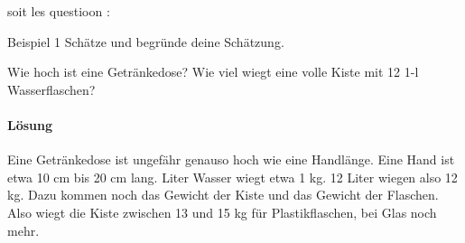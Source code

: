 \documentclass[a4paper,12pt]{extarticle}
\begin{document}
\makeatletter
\begin{tcolorbox}[enhanced,
  skin=bicolor,
  arc=0pt,
  coltitle=white,
  colframe=textnewGreen,
  colback=bgnewGreen,
  colbacklower=white,
  fonttitle=\bfseries,
  detach title,
  title={Exercice},
  before upper*={%
    \vskip-\dimexpr\kvtcb@boxsep+\kvtcb@top+.1pt
    \hspace*{-\dimexpr\kvtcb@boxsep+\kvtcb@leftupper+.1pt}%
    \expandafter\titlebox\expandafter{\tcbtitletext} %
  }]
soit les questioon :
\end{tcolorbox}
\makeatother
\begin{gruenebox}{Beispiel 1}
 Schätze und begründe deine Schätzung.
 \begin{tasks}
 \task Wie hoch ist eine Getränkedose?
 \task  Wie viel wiegt eine volle Kiste mit 12 1-l Wasserflaschen?
 \end{tasks}
 \tcblower
 \paragraph{Lösung}
 \begin{tasks}
 \task Eine Getränkedose ist ungefähr genauso hoch wie eine Handlänge. Eine Hand ist etwa 10 cm bis 20 cm lang.
 \task Liter Wasser wiegt etwa 1 kg. 12 Liter wiegen also 12 kg. Dazu kommen noch das Gewicht der Kiste und das Gewicht der Flaschen. Also wiegt die Kiste zwischen 13 und 15 kg für Plastikflaschen, bei Glas noch mehr.   
 \end{tasks}
\end{gruenebox}
\end{document}
